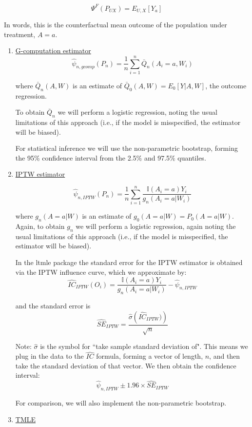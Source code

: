 \documentclass[answers]{exam}
\begin{document}
\[
\Psi^F(P_{UX})=E_{U,X}[Y_{a}]
\]

In words, this is the counterfactual mean outcome of the population under treatment, $A = a$. 

\begin{enumerate}
\item \underline{G-computation estimator}
\[
\hat{\psi}_{n,gcomp}(P_{n})=\frac{1}{n}\sum_{i=1}^{n}\bar{Q}_{n}(A_i=a,W_{i})
\]

where $\bar{Q}_{n}(A,W)$ is an estimate of $\bar{Q}_{0}(A,W)=E_{0}[Y| A,W]$, the outcome regression.

To obtain $\bar{Q}_{n}$ we will perform a logistic regression, noting the usual limitations of this approach (i.e., if the model is misspecified, the estimator will be biased).

For statistical inference we will use the non-parametric bootstrap, forming the 95\% confidence interval from the 2.5\% and 97.5\% quantiles. 

\item \underline{IPTW estimator}

\[
\hat{\psi}_{n, IPTW}(P_{n})=\frac{1}{n}\sum_{i=1}^{n}\frac{\mathbb{I}(A_{i}=a)Y_{i}}{g_{n}(A_{i}=a | W_{i})}
\]

where $g_{n}(A=a\vert W)$ is an estimate of $g_{0}(A=a\vert W)=P_{0}(A=a\vert W)$.
Again, to obtain $g_{n}$ we will perform a logistic regression, again noting the usual limitations of this approach (i.e., if the model is misspecified, the estimator will be biased).

In the ltmle package the standard error for the IPTW estimator is obtained via the IPTW influence curve, which we approximate by:
\[
\hat{IC}_{IPTW}(O_{i})=\frac{\mathbb{I}(A_{i}=a)Y_{i}}{g_{n}(A_{i}=a\vert W_{i})}-\hat{\psi}_{n,IPTW}
\]

and the standard error is
\[
\hat{SE}_{IPTW}=\frac{\hat{\sigma}\left(\hat{IC}_{IPTW})\right)}{\sqrt{n}}
\]

Note: $\hat{\sigma}$ is the symbol for ``take sample standard deviation of".  This means we plug in the data to the $\hat{IC}$ formula, forming a vector of length, $n$, and then take the standard deviation of that vector. We then obtain the confidence interval:
\[
\hat{\psi}_{n, IPTW}\pm 1.96\times \hat{SE}_{IPTW}
\]

For comparison, we will also implement the non-parametric bootstrap.

\item \underline{TMLE}


\end{enumerate}
\end{document}
